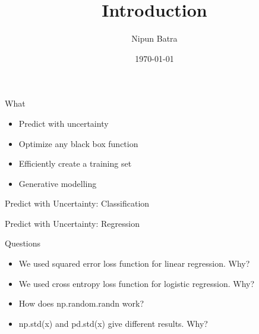 \documentclass[handout]{beamer}
\begin{document}
\title{Introduction}
\author{Nipun Batra}
\date{\today}
\maketitle

\begin{frame}{What}
    \begin{itemize}
        \item Predict with uncertainty
        \item Optimize any black box function
        \item Efficiently create a training set
        \item Generative modelling
    \end{itemize}

    
\end{frame}

\begin{frame}{Predict with Uncertainty: Classification}
    
\end{frame}

\begin{frame}{Predict with Uncertainty: Regression}
    
\end{frame}


\begin{frame}{Questions}
    \begin{itemize}
        \item We used squared error loss function for linear regression. Why?
        \item We used cross entropy loss function for logistic regression. Why?
        \item How does np.random.randn work?
        \item np.std(x) and pd.std(x) give different results. Why?

    \end{itemize}
    
\end{frame}
\end{document}
